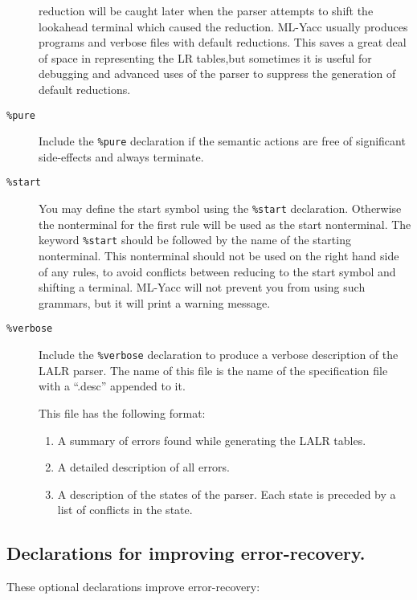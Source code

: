 \begin{description}
reduction will be caught later when the parser attempts to shift the lookahead
terminal which caused the reduction. ML-Yacc usually produces programs and
verbose files with default reductions.  This saves a great deal of
space in representing the LR tables,but
sometimes it is useful for debugging and advanced
uses of the parser to suppress the generation of default reductions.
\item[{\tt \%pure}]
Include the {\tt \%pure} declaration if the semantic actions
are free of significant side-effects and always terminate.
\item[{\tt \%start}]
You may define the start symbol using
the {\tt \%start} declaration.  Otherwise the nonterminal for the
first rule will be used as the start nonterminal.
The keyword {\tt \%start} should be followed by the name of the starting
nonterminal.  This nonterminal should not be used on the right hand
side of any rules, to avoid conflicts between reducing to the start
symbol and shifting a terminal.  ML-Yacc will not prevent you
from using such grammars, but it will print a warning message.
\item[{\tt \%verbose}]

Include the {\tt \%verbose} declaration to produce a verbose
description of the LALR parser.   The name of this file is
the name of the specification file with a ``.desc'' appended to it.

     This file has the following format:
\begin{enumerate}

\item A summary of errors found while generating the LALR tables.
\item A detailed description of all errors.
\item A description of the states of the parser.  Each state
        is preceded by a list of conflicts in the state.

\end{enumerate}
\end{description}

\subsection{Declarations for improving error-recovery.}

These optional declarations improve error-recovery:

